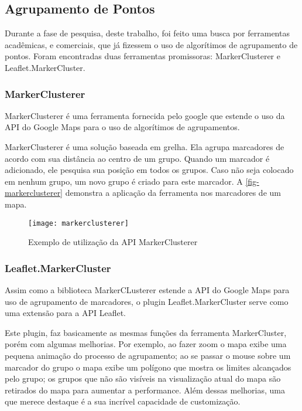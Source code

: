 \subsection{Agrupamento de Pontos}
		Durante a fase de pesquisa, deste trabalho, foi feito uma busca por ferramentas acadêmicas, e comerciais, que já fizessem o uso de algorítimos de agrupamento de pontos. Foram encontradas duas ferramentas promissoras: MarkerClusterer e Leaflet.MarkerCluster.
		
		
		\subsubsection{MarkerClusterer}		
		MarkerClusterer \cite[188]{livroGoogleApiV3} é uma ferramenta fornecida pelo google que estende o uso da API do Google Maps para o uso de algorítimos de agrupamentos.
		
		MarkerClusterer é uma solução baseada em grelha. Ela agrupa marcadores de acordo com sua distância ao centro de um grupo. Quando um marcador é adicionado, ele pesquisa sua posição em todos os grupos. Caso não seja colocado em nenhum grupo, um novo grupo é criado para este marcador. A \autoref{fig-markerclusterer} demonstra a aplicação da ferramenta nos marcadores de um mapa.
	\begin{figure}[htb]
	\caption{\label{fig-markerclusterer}Exemplo de utilização da API MarkerClusterer }
	\begin{center}
	    \texttt{[image: markerclusterer]}
	\end{center}
\end{figure}

		\subsubsection{Leaflet.MarkerCluster}
		Assim como a biblioteca MarkerCLusterer estende a API do Google Maps para uso de agrupamento de marcadores, o plugin Leaflet.MarkerCluster\cite{gitleafletmarker} serve como uma extensão para a API Leaflet. 
		
		Este plugin, faz basicamente as mesmas funções da ferramenta MarkerCluster, porém com algumas melhorias. Por exemplo, ao fazer zoom o mapa exibe uma pequena animação do processo de agrupamento; ao se passar o mouse sobre um marcador do grupo o mapa exibe um polígono que mostra os limites alcançados pelo grupo; os grupos que não são visíveis  na visualização atual do mapa são retirados do mapa para aumentar a performance. Além dessas melhorias, uma que merece destaque é a sua incrível capacidade de customização. 

